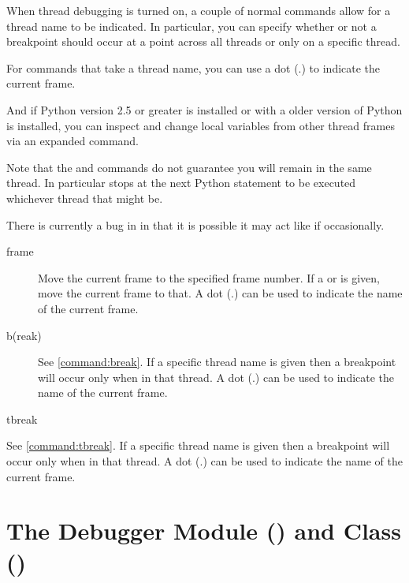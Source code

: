When thread debugging is turned on, a couple of normal 
commands allow for a thread name to be indicated. In particular, you
can specify whether or not a breakpoint should occur at a point across
all threads or only on a specific thread. 

For commands that take a thread name, you can use a dot (.) to
indicate the current frame.

And if Python version 2.5 or greater is installed or
with a older version of Python is installed, you can inspect and change
local variables from other thread frames via an expanded 
command.

Note that the  and  commands do not guarantee
you will remain in the same thread. In particular  stops at
the next Python statement to be executed whichever thread that might
be.

There is currently a bug in  in that it is possible it may
act like  if occasionally.

\begin{description}
\item[frame  ]

Move the current frame to the specified frame number. If a
 or is given, move the current
frame to that. A dot (.) can be used to indicate the name of the
current frame.

\item[b(reak)
  ]
See \ref{command:break}. If a specific thread name is given then a
  breakpoint will occur only when in that thread. A dot (.) can be
  used to indicate the name of the current frame.

\item[tbreak
  ]
\end{description}
See \ref{command:tbreak}. If a specific thread name is given then a
  breakpoint will occur only when in that thread. A dot (.) can be
  used to indicate the name of the current frame.

\section{The Debugger Module () and Class () \label{pydb-module-class}}

